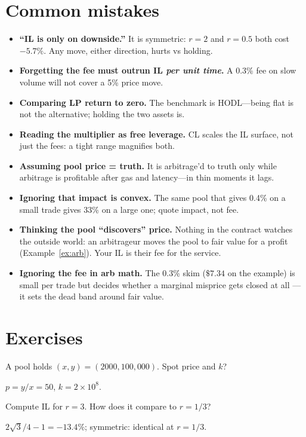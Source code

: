 \section{Common mistakes}
\begin{itemize}
\item \textbf{``IL is only on downside.''} It is symmetric: $r=2$ and $r=0.5$ both cost
  $-5.7\%$. Any move, either direction, hurts vs holding.
\item \textbf{Forgetting the fee must outrun IL \emph{per unit time}.} A 0.3\% fee on slow
  volume will not cover a 5\% price move.
\item \textbf{Comparing LP return to zero.} The benchmark is HODL---being flat is not the
  alternative; holding the two assets is.
\item \textbf{Reading the multiplier as free leverage.} CL scales the IL surface, not just
  the fees: a tight range magnifies both.
\item \textbf{Assuming pool price = truth.} It is arbitrage'd to truth only while arbitrage
  is profitable after gas and latency---in thin moments it lags.
\item \textbf{Ignoring that impact is convex.} The same pool that gives 0.4\% on a small
  trade gives 33\% on a large one; quote impact, not fee.
\item \textbf{Thinking the pool ``discovers'' price.}
Nothing in the contract watches the outside world: an arbitrageur
moves the pool to fair value for a profit
(Example~\ref{ex:arb}). Your IL is their fee for the service.
\item \textbf{Ignoring the fee in arb math.} The 0.3\% skim
($\$7.34$ on the example) is small per trade but decides whether a
marginal misprice gets closed at all --- it sets the dead band
around fair value.\end{itemize}

\section{Exercises}
\begin{exercise}[easy]
A pool holds $(x,y)=(2000,100{,}000)$. Spot price and $k$?
\end{exercise}
\begin{solution}
$p=y/x=50$, $k=2\times10^{8}$.
\end{solution}

\begin{exercise}[easy]
Compute IL for $r=3$. How does it compare to $r=1/3$?
\end{exercise}
\begin{solution}
$2\sqrt3/4-1=-13.4\%$; symmetric: identical at $r=1/3$.
\end{solution}

